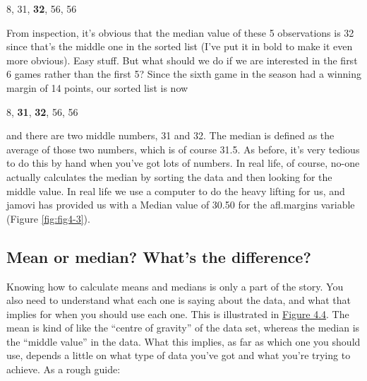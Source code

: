 \documentclass[
]{book}
\begin{document}
8, 31, \textbf{32}, 56, 56

From inspection, it's obvious that the median value of these 5 observations is 32 since that's the middle one in the sorted list (I've put it in bold to make it even more obvious). Easy stuff. But what should we do if we are interested in the first 6 games rather than the first 5? Since the sixth game in the season had a winning margin of 14 points, our sorted list is now

8, \textbf{31}, \textbf{32}, 56, 56

and there are two middle numbers, 31 and 32. The median is defined as the average of those two numbers, which is of course 31.5. As before, it's very tedious to do this by hand when you've got lots of numbers. In real life, of course, no-one actually calculates the median by sorting the data and then looking for the middle value. In real life we use a computer to do the heavy lifting for us, and jamovi has provided us with a Median value of 30.50 for the afl.margins variable (Figure \ref{fig:fig4-3}).

\hypertarget{mean-or-median-whats-the-difference}{%
\subsection{Mean or median? What's the difference?}\label{mean-or-median-whats-the-difference}}

Knowing how to calculate means and medians is only a part of the story. You also need to understand what each one is saying about the data, and what that implies for when you should use each one. This is illustrated in \protect\hyperlink{Fig4.4}{Figure 4.4}. The mean is kind of like the ``centre of gravity'' of the data set, whereas the median is the ``middle value'' in the data. What this implies, as far as which one you should use, depends a little on what type of data you've got and what you're trying to achieve. As a rough guide:
\end{document}
